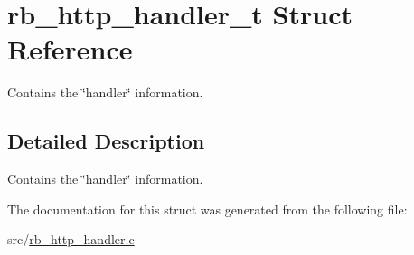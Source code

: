 \hypertarget{structrb__http__handler__t}{\section{rb\-\_\-http\-\_\-handler\-\_\-t Struct Reference}
\label{structrb__http__handler__t}
}


Contains the \char`\"{}handler\char`\"{} information.  




\subsection{Detailed Description}
Contains the \char`\"{}handler\char`\"{} information. 

The documentation for this struct was generated from the following file\-:\begin{DoxyCompactItemize}
\item 
src/\hyperlink{rb__http__handler_8c}{rb\-\_\-http\-\_\-handler.\-c}\end{DoxyCompactItemize}
